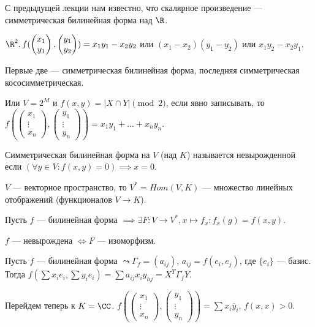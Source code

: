 С предыдущей лекции нам известно, что скалярное произведение --- симметрическая билинейная форма над  $\R$.
\begin{example}
    $\R^2, f(\begin{pmatrix} x_1 \\ y_1 \end{pmatrix}, \begin{pmatrix} y_1 \\ y_2 \end{pmatrix}) =x_1y_1 - x_2y_2$ или $(x_1-x_2)(y_1-y_2)$ или $x_1y_2 - x_2y_1$.

    Первые две --- симметрическая билинейная форма, последняя симметрическая кососимметрическая. 
 
    Или $V=2^M$ и  $f(x,y) = | X \cap Y| \pmod 2$, если явно записывать, то  $f(\begin{pmatrix} x_1 \\ \vdots \\ x_n \end{pmatrix}, \begin{pmatrix} y_1 \\ \vdots \\ y_n \end{pmatrix}) = x_1y_1 + \ldots + x_ny_n$.
\end{example}
\begin{definition}
    Симметрическая билинейная форма на $V$ (над $K$) называется невырожденной если $(\forall y \in V: f(x, y) = 0) \implies x = 0$.
\end{definition}
\begin{definition}
    $V$ --- векторное пространство, то  $V^* = Hom(V, K)$ --- множество линейных отображений (функционалов $V \to K$).
\end{definition}

Пусть $f$ --- билинейная форма  $\implies \exists F\!: V \to V^*, x \mapsto f_x\!: f_x(g) = f(x, y)$.

$f$ --- невырождена $\iff F$ --- изоморфизм. 

Пусть $f$ --- билинейная форма  $\leadsto \Gamma_f = (a_{ij})$,  $a_{ij} = f(e_i, e_j)$, где  $\{e_i\}$ --- базис. Тогда  $f(\sum x_i e_i, \sum y_i e_i) = \sum a_{ij} x_i y_{hj} = X^T \Gamma_f Y$.

Перейдем теперь к $K = \CC$.  $f(\begin{pmatrix} x_1 \\ \vdots \\ x_n \end{pmatrix}, \begin{pmatrix} y_1 \\ \vdots \\ y_n \end{pmatrix}) = \sum x_i \overline{y}_i$, $f(x, x) > 0$.

